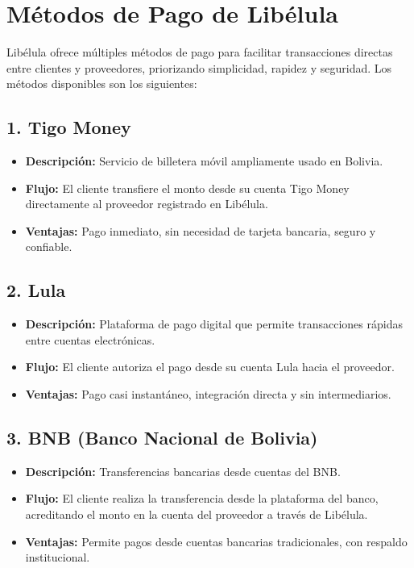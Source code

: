 \documentclass[12pt,a4paper]{article}
\begin{document}
		
\section*{Métodos de Pago de Libélula}

Libélula ofrece múltiples métodos de pago para facilitar transacciones directas entre clientes y proveedores, priorizando simplicidad, rapidez y seguridad. Los métodos disponibles son los siguientes:

\subsection*{1. Tigo Money}
\begin{itemize}
	\item \textbf{Descripción:} Servicio de billetera móvil ampliamente usado en Bolivia.
	\item \textbf{Flujo:} El cliente transfiere el monto desde su cuenta Tigo Money directamente al proveedor registrado en Libélula.
	\item \textbf{Ventajas:} Pago inmediato, sin necesidad de tarjeta bancaria, seguro y confiable.
\end{itemize}

\subsection*{2. Lula}
\begin{itemize}
	\item \textbf{Descripción:} Plataforma de pago digital que permite transacciones rápidas entre cuentas electrónicas.
	\item \textbf{Flujo:} El cliente autoriza el pago desde su cuenta Lula hacia el proveedor.
	\item \textbf{Ventajas:} Pago casi instantáneo, integración directa y sin intermediarios.
\end{itemize}

\subsection*{3. BNB (Banco Nacional de Bolivia)}
\begin{itemize}
	\item \textbf{Descripción:} Transferencias bancarias desde cuentas del BNB.
	\item \textbf{Flujo:} El cliente realiza la transferencia desde la plataforma del banco, acreditando el monto en la cuenta del proveedor a través de Libélula.
	\item \textbf{Ventajas:} Permite pagos desde cuentas bancarias tradicionales, con respaldo institucional.
\end{itemize}
\end{document}
